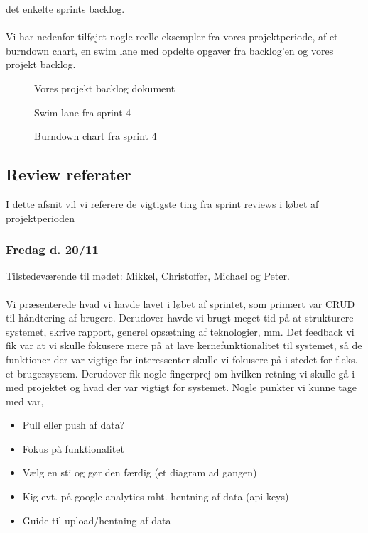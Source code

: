 det enkelte sprints backlog.
\\\\
Vi har nedenfor tilføjet nogle reelle eksempler fra vores projektperiode, af et burndown chart, en swim lane med opdelte opgaver fra backlog'en og vores projekt backlog.
\begin{figure}[here]
    \caption{Vores projekt backlog dokument}
    \label{fig:projekt-backlog}
\end{figure}
\begin{figure}[here]
    \caption{Swim lane fra sprint 4}
    \label{fig:swim-lane}
\end{figure}
\begin{figure}[here]
    \caption{Burndown chart fra sprint 4}
    \label{fig:burndown-chart}
\end{figure}
\subsection{Review referater}
I dette afsnit vil vi referere de vigtigste ting fra sprint reviews i løbet af projektperioden
\subsubsection{Fredag d. 20/11}
Tilstedeværende til mødet: Mikkel, Christoffer, Michael og Peter.
\\\\
Vi præsenterede hvad vi havde lavet i løbet af sprintet, som primært var CRUD til håndtering af brugere. Derudover havde vi brugt meget tid på at strukturere systemet, skrive rapport, generel opsætning af teknologier, mm.
Det feedback vi fik var at vi skulle fokusere mere på at lave kernefunktionalitet til systemet, så de funktioner der var vigtige for interessenter skulle vi fokusere på i stedet for f.eks. et brugersystem.
Derudover fik nogle fingerprej om hvilken retning vi skulle gå i med projektet og hvad der var vigtigt for systemet.
Nogle punkter vi kunne tage med var,
\begin{itemize}
    \item{Pull eller push af data?}
    \item{Fokus på funktionalitet}
    \item{Vælg en sti og gør den færdig (et diagram ad gangen)}
    \item{Kig evt. på google analytics mht. hentning af data (api keys)}
    \item{Guide til upload/hentning af data}
\end{itemize}
